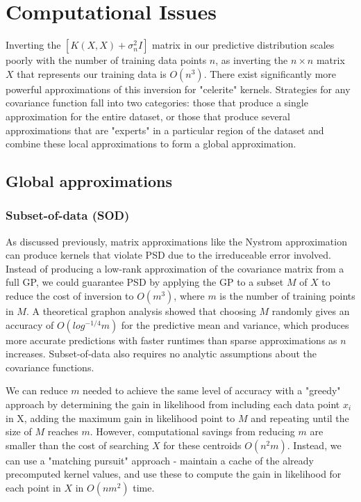 \section{Computational Issues}

Inverting the $[K(X,X) + \sigma^2_nI]$ matrix in our predictive distribution scales poorly with the number of training data points $n$, as inverting the $n \times n$ matrix $X$ that represents our training data is $O(n^3)$. There exist significantly more powerful approximations of this inversion for "celerite" kernels. Strategies for any covariance function fall into two categories: those that produce a single approximation for the entire dataset, or those that produce several approximations that are "experts" in a particular region of the dataset and combine these local approximations to form a global approximation. 

\subsection{Global approximations \cite{big-data}}

\subsubsection{Subset-of-data (SOD)}
As discussed previously, matrix approximations like the Nystrom approximation can produce kernels that violate PSD due to the irreduceable error involved. Instead of producing a low-rank approximation of the covariance matrix from a full GP, we could guarantee PSD by applying the GP to a subset $M$ of $X$ to reduce the cost of inversion to $O(m^3)$, where $m$ is the number of training points in $M$. A theoretical graphon analysis showed that choosing $M$ randomly gives an accuracy of $O(log^{-1/4}m)$ for the predictive mean and variance, which produces more accurate predictions with faster runtimes than sparse approximations as $n$ increases. \cite{random-subsampling} Subset-of-data also requires no analytic assumptions about the covariance functions.


We can reduce $m$ needed to achieve the same level of accuracy with a "greedy" approach by determining the gain in likelihood from including each data point $x_i$ in X, adding the maximum gain in likelihood point to $M$ and repeating until the size of $M$ reaches $m$. However, computational savings from reducing $m$ are smaller than the cost of searching $X$ for these centroids $O(n^2m)$. Instead, we can use a "matching pursuit" approach - maintain a cache of the already precomputed kernel values, and use these to compute the gain in likelihood for each point in $X$ in $O(nm^2)$ time. \cite{matching-pursuit}

